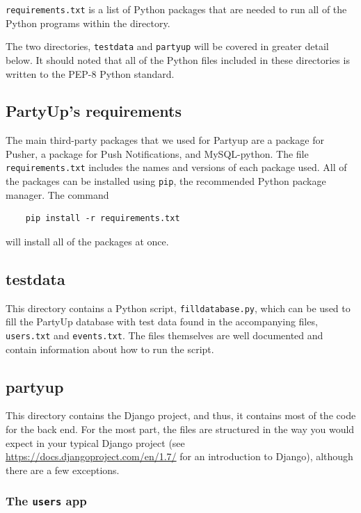 \documentclass[12pt]{article}
\begin{document}
\texttt{requirements.txt} is a list of Python packages that are needed to
run all of the Python programs within the directory.

The two directories, \texttt{testdata} and \texttt{partyup} will be covered
in greater detail below.
It should noted that all of the Python files included in these directories
is written to the PEP-8 Python standard.

\subsection{PartyUp's requirements}

The main third-party packages that we used for Partyup are a package for Pusher, a package for Push Notifications, and MySQL-python. 
The file \texttt{requirements.txt} includes the names and versions of each package used.
All of the packages can be installed using \texttt{pip}, the recommended
Python package manager.
The command
\begin{lstlisting}
    pip install -r requirements.txt
\end{lstlisting}
will install all of the packages at once.

\subsection{testdata}

This directory contains a Python script, \texttt{filldatabase.py},
which can be used to fill the PartyUp database with test data
found in the accompanying files, \texttt{users.txt} and \texttt{events.txt}.
The files themselves are well documented and contain information about
how to run the script.

\subsection{partyup}

This directory contains the Django project, and thus,
it contains most of the code for the back end.
For the most part, the files are structured in the way you would
expect in your typical Django project
(see \url{https://docs.djangoproject.com/en/1.7/} for an introduction to Django),
although there are a few exceptions.

\subsubsection{The \texttt{users} app}
\end{document}
